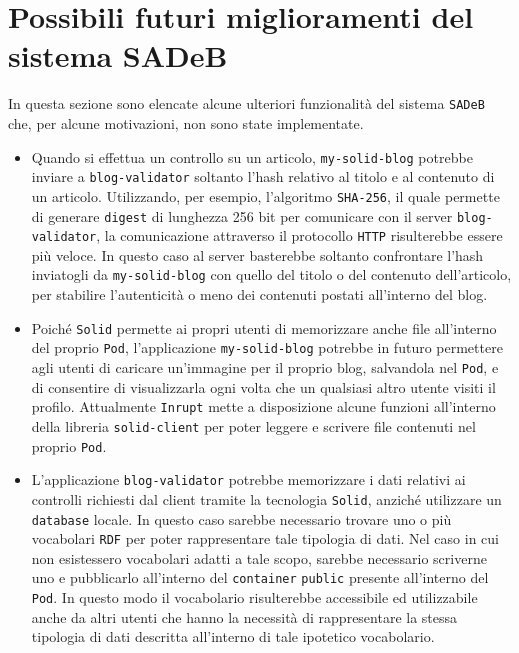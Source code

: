 \bigskip

\section{Possibili futuri miglioramenti del sistema SADeB}

\medskip

In questa sezione sono elencate alcune ulteriori funzionalità del sistema {\tt SADeB} che, per alcune motivazioni, non sono state implementate.

\begin{itemize}
	\item Quando si effettua un controllo su un articolo, {\tt my-solid-blog} potrebbe inviare a {\tt blog-validator} soltanto l'hash relativo al titolo e al contenuto di un articolo. Utilizzando, per esempio, l'algoritmo {\tt SHA-256}, il quale permette di generare {\tt digest} di lunghezza 256 bit per comunicare con il server {\tt blog-validator}, la comunicazione attraverso il protocollo {\tt HTTP} risulterebbe essere più veloce. In questo caso al server basterebbe soltanto confrontare l'hash inviatogli da {\tt my-solid-blog} con quello del titolo o del contenuto dell'articolo, per stabilire l'autenticità o meno dei contenuti postati all'interno del blog.
	\item Poiché {\tt Solid} permette ai propri utenti di memorizzare anche file all'interno del proprio {\tt Pod}, l'applicazione {\tt my-solid-blog} potrebbe in futuro permettere agli utenti di caricare un'immagine per il proprio blog, salvandola nel {\tt Pod}, e di consentire di visualizzarla ogni volta che un qualsiasi altro utente visiti il profilo. Attualmente {\tt Inrupt} mette a disposizione alcune funzioni all'interno della libreria {\tt solid-client} per poter leggere e scrivere file contenuti nel proprio {\tt Pod}.
	\item L'applicazione {\tt blog-validator} potrebbe memorizzare i dati relativi ai controlli richiesti dal client tramite la tecnologia {\tt Solid}, anziché utilizzare un {\tt database} locale. In questo caso sarebbe necessario trovare uno o più vocabolari {\tt RDF} per poter rappresentare tale tipologia di dati. Nel caso in cui non esistessero vocabolari adatti a tale scopo, sarebbe necessario scriverne uno e pubblicarlo all'interno del {\tt container} {\tt public} presente all'interno del {\tt Pod}. In questo modo il vocabolario risulterebbe accessibile ed utilizzabile anche da altri utenti che hanno la necessità di rappresentare la stessa tipologia di dati descritta all'interno di tale ipotetico vocabolario.

\end{itemize}

